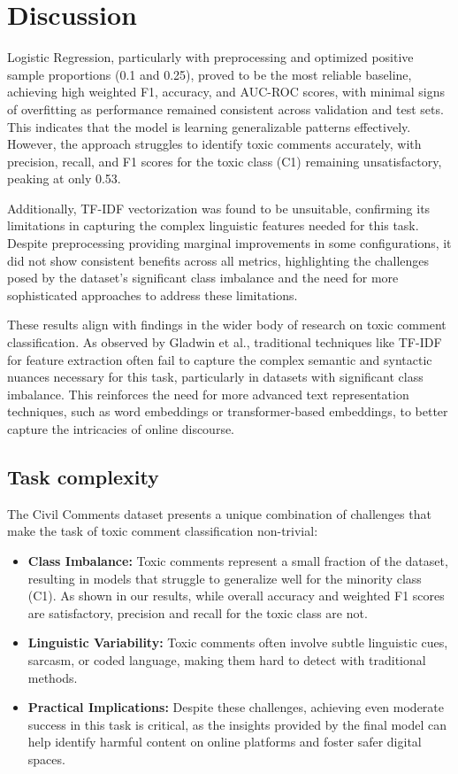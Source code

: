 \section{Discussion}
Logistic Regression, particularly with preprocessing and optimized positive sample proportions (0.1 and 0.25), proved to be the most reliable baseline, achieving high weighted F1, accuracy, and AUC-ROC scores, with minimal signs of overfitting as performance remained consistent across validation and test sets. This indicates that the model is learning generalizable patterns effectively. However, the approach struggles to identify toxic comments accurately, with precision, recall, and F1 scores for the toxic class (C1) remaining unsatisfactory, peaking at only 0.53.

Additionally, TF-IDF vectorization was found to be unsuitable, confirming its limitations in capturing the complex linguistic features needed for this task. Despite preprocessing providing marginal improvements in some configurations, it did not show consistent benefits across all metrics, highlighting the challenges posed by the dataset's significant class imbalance and the need for more sophisticated approaches to address these limitations.

These results align with findings in the wider body of research on toxic comment classification. As observed by Gladwin et al., traditional techniques like TF-IDF for feature extraction often fail to capture the complex semantic and syntactic nuances necessary for this task, particularly in datasets with significant class imbalance. This reinforces the need for more advanced text representation techniques, such as word embeddings or transformer-based embeddings, to better capture the intricacies of online discourse. \cite{Gladwin2022}

\subsection{Task complexity}
The Civil Comments dataset presents a unique combination of challenges that make the task of toxic comment classification non-trivial:

\begin{itemize}
    \item \textbf{Class Imbalance:} Toxic comments represent a small fraction of the dataset, resulting in models that struggle to generalize well for the minority class (C1). As shown in our results, while overall accuracy and weighted F1 scores are satisfactory, precision and recall for the toxic class are not.
    \item \textbf{Linguistic Variability:} Toxic comments often involve subtle linguistic cues, sarcasm, or coded language, making them hard to detect with traditional methods.
    \item \textbf{Practical Implications:} Despite these challenges, achieving even moderate success in this task is critical, as the insights provided by the final model can help identify harmful content on online platforms and foster safer digital spaces.
\end{itemize}

